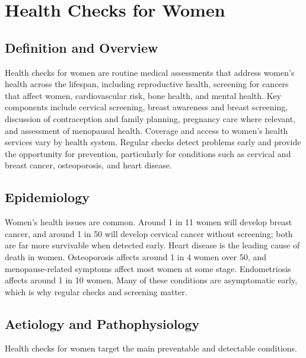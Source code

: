 \chapter{Health Checks for Women}

\section*{Definition and Overview}
Health checks for women are routine medical assessments that address women's health across the lifespan, including reproductive health, screening for cancers that affect women, cardiovascular risk, bone health, and mental health. Key components include cervical screening, breast awareness and breast screening, discussion of contraception and family planning, pregnancy care where relevant, and assessment of menopausal health. Coverage and access to women's health services vary by health system. Regular checks detect problems early and provide the opportunity for prevention, particularly for conditions such as cervical and breast cancer, osteoporosis, and heart disease.

\section*{Epidemiology}
Women's health issues are common. Around 1 in 11 women will develop breast cancer, and around 1 in 50 will develop cervical cancer without screening; both are far more survivable when detected early. Heart disease is the leading cause of death in women. Osteoporosis affects around 1 in 4 women over 50, and menopause-related symptoms affect most women at some stage. Endometriosis affects around 1 in 10 women. Many of these conditions are asymptomatic early, which is why regular checks and screening matter.

\section*{Aetiology and Pathophysiology}
Health checks for women target the main preventable and detectable conditions.

